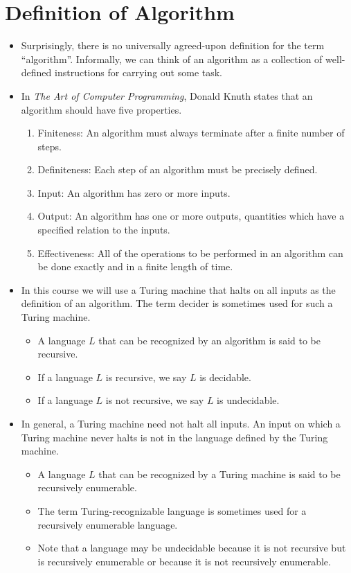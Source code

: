 \documentclass[]{article}
\begin{document}
\section{Definition of Algorithm}
\begin{itemize}
\item Surprisingly, there is no universally agreed-upon definition for the term
``algorithm''. Informally, we can think of an algorithm as a collection of well-
defined instructions for carrying out some task.
\item In \emph{The Art of Computer Programming}, Donald Knuth states that an
algorithm should have five properties.
\begin{enumerate}
\item Finiteness: An algorithm must always terminate after a finite number of
steps.
\item Definiteness: Each step of an algorithm must be precisely defined.
\item Input: An algorithm has zero or more inputs.
\item Output: An algorithm has one or more outputs, quantities which have a
specified relation to the inputs.
\item Effectiveness: All of the operations to be performed in an algorithm can
be done exactly and in a finite length of time.
\end{enumerate}
\item In this course we will use a Turing machine that halts on all inputs as
the definition of an algorithm. The term decider is sometimes used for  such a
Turing machine.
\begin{itemize}
\item A language $L$ that can be recognized by an algorithm is said to be
recursive.
\item If a language $L$ is recursive, we say $L$ is decidable.
\item If a language $L$ is not recursive, we say $L$ is undecidable.
\end{itemize}
\item In general, a Turing machine need not halt all inputs. An input on which a
Turing machine never halts is not in the language defined by the Turing machine.
\begin{itemize}
\item A language $L$ that can be recognized by a Turing machine is said to be
recursively enumerable.
\item The term Turing-recognizable language is sometimes used for a recursively
enumerable language.
\item Note that a language may be undecidable because it is not recursive but is
recursively enumerable or because it is not  recursively enumerable.
\end{itemize}
\end{itemize}
\end{document}
